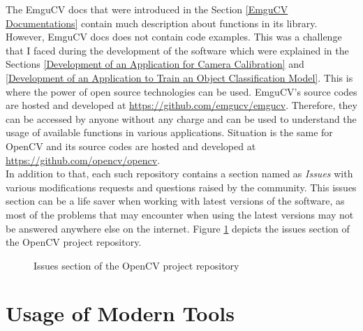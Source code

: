 \documentclass[a4paper,12pt]{report}%
\begin{document}
The EmguCV docs that were introduced in the Section \ref{EmguCV Documentations} contain much description about functions in its library.
However, EmguCV docs does not contain code examples. This was a challenge  that I faced during the development of the software which were explained in the Sections \ref{Development of an Application for Camera Calibration} and \ref{Development of an Application to Train an Object Classification Model}. This is where the power of open source technologies can be used. EmguCV's source codes are hosted and developed at \url{https://github.com/emgucv/emgucv}. Therefore, they can be accessed by anyone without any charge and can be used to understand the usage of available functions in various applications. Situation is the same for OpenCV and its source codes are hosted and developed at \url{https://github.com/opencv/opencv}.\\

In addition to that, each such repository contains a section named as \textit{Issues} with various modifications requests and questions raised by the community. This issues section can be a life saver when working with latest versions of the software, as most of the problems that may encounter when using the latest versions may not be answered anywhere else on the internet. Figure \ref{fig:issues} depicts the issues section of the OpenCV project repository.


\begin{figure}[H]
	\centering
	\caption{Issues section of the OpenCV project repository}
	\label{fig:issues}
\end{figure}

\pagebreak
\section{Usage of Modern Tools}
\end{document}
